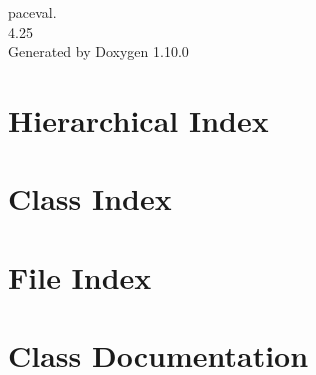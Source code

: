 \documentclass[twoside]{book}
\newcommand{\+}{\discretionary{\mbox{\scriptsize$\hookleftarrow$}}{}{}}
\newcommand{\clearemptydoublepage}{%
    \newpage{\pagestyle{empty}\cleardoublepage}%
  }
\begin{document}
  \raggedbottom
    \hypersetup{pageanchor=false,
                bookmarksnumbered=true,
                pdfencoding=unicode
               }
  \begin{titlepage}
  \vspace*{7cm}
  \begin{center}%
  {\Large paceval.}\\
  [1ex]\large 4.\+25 \\
  \vspace*{1cm}
  {\large Generated by Doxygen 1.10.0}\\
  \end{center}
  \end{titlepage}
  \clearemptydoublepage
  \tableofcontents
  \clearemptydoublepage
  \hypersetup{pageanchor=true}

\chapter{Hierarchical Index}

\chapter{Class Index}

\chapter{File Index}

\chapter{Class Documentation}





























\end{document}
